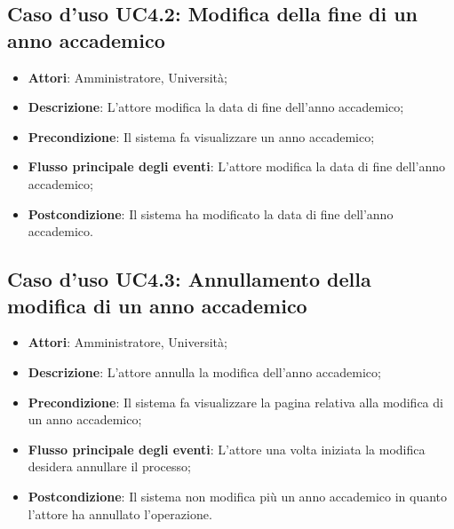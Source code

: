 \subsection{Caso d'uso \texorpdfstring{UC4.2}{UC4.2}: Modifica della fine di un anno accademico}
\begin{itemize}
\item \textbf{Attori}: Amministratore, Università;
\item \textbf{Descrizione}: L'attore modifica la data di fine dell'anno accademico;
\item \textbf{Precondizione}: Il sistema fa visualizzare un anno accademico;
\item \textbf{Flusso principale degli eventi}: L'attore modifica la data di fine dell'anno accademico;
\item \textbf{Postcondizione}: Il sistema ha modificato la data di fine dell'anno accademico.
\end{itemize}
\subsection{Caso d'uso \texorpdfstring{UC4.3}{UC4.3}: Annullamento della modifica di un anno accademico}
\begin{itemize}
\item \textbf{Attori}: Amministratore, Università;
\item \textbf{Descrizione}: L'attore annulla la modifica dell'anno accademico;
\item \textbf{Precondizione}: Il sistema fa visualizzare la pagina relativa alla modifica di un anno accademico;
\item \textbf{Flusso principale degli eventi}: L'attore una volta iniziata la modifica desidera annullare il processo;
\item \textbf{Postcondizione}: Il sistema non modifica più un anno accademico in quanto l'attore ha annullato l'operazione.
\end{itemize}
